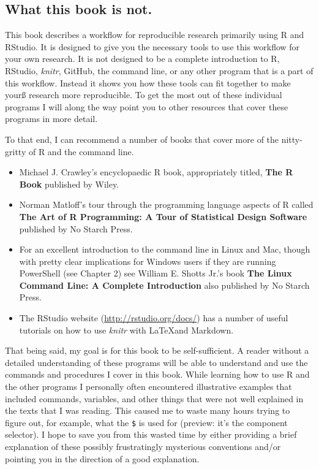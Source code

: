 \subsection{What this book is not.}\label{WhatNot}

This book describes a workflow for reproducible research primarily using R and RStudio. It is designed to give you the necessary tools to use this workflow for your own research. It is not designed to be a complete introduction to R, RStudio, {\emph{knitr}}, GitHub, the command line, or any other program that is a part of this workflow. Instead it shows you how these tools can fit together to make yourß research more reproducible. To get the most out of these individual programs I will along the way point you to other resources that cover these programs in more detail.

To that end, I can recommend a number of books that cover more of the nitty-gritty of R and the command line.

\begin{itemize}
    \item Michael J. Crawley's encyclopaedic R book, appropriately titled, \textbf{The R Book} published by Wiley.
    
    \item Norman Matloff's tour through the programming language aspects of  R called \textbf{The Art of R Programming: A Tour of Statistical Design Software} published by No Starch Press.
    
    \item For an excellent introduction to the command line in Linux and Mac, though with pretty clear implications for Windows users if they are running PowerShell (see Chapter 2) see William E. Shotts Jr.'s book \textbf{The Linux Command Line: A Complete Introduction} also published by No Starch Press.
    
    \item The RStudio website (\url{http://rstudio.org/docs/}) has a
  number of useful tutorials on how to use {\emph{knitr}} with \LaTeX and Markdown.
\end{itemize}

That being said, my goal is for this book to be self-sufficient. A reader without a detailed understanding of these programs will be able to understand and use the commands and procedures I cover in this book. While learning how to use R and the other programs I personally often encountered illustrative examples that included commands, variables, and other things that were not well explained in the texts that I was reading. This caused me to waste many hours trying to figure out, for example, what the \texttt{\$} is used for (preview: it's the component selector). I hope to save you from this wasted time by either providing a brief explanation of these possibly frustratingly mysterious conventions and/or pointing you in the direction of a good explanation.


